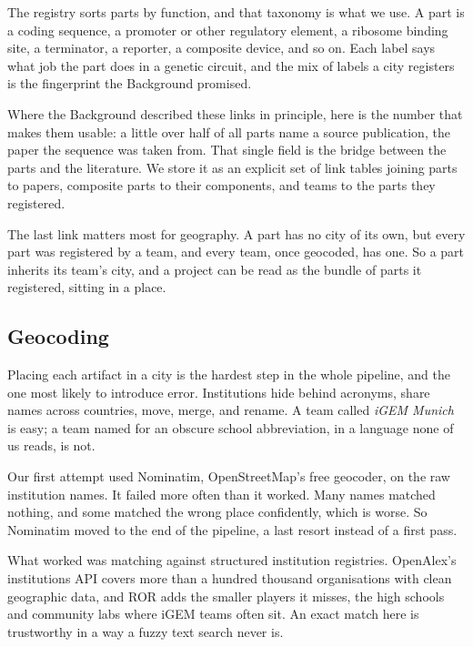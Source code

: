 \documentclass[12pt,a4paper]{article}
\begin{document}
	The registry sorts parts by function, and that taxonomy is what we use. A part is
	a coding sequence, a promoter or other regulatory element, a ribosome binding
	site, a terminator, a reporter, a composite device, and so on. Each label says
	what job the part does in a genetic circuit, and the mix of labels a city
	registers is the fingerprint the Background promised.
	
	Where the Background described these links in principle, here is the number that
	makes them usable: a little over half of all parts name a source publication, the
	paper the sequence was taken from. That single field is the bridge between the
	parts and the literature. We store it as an explicit set of link tables joining
	parts to papers, composite parts to their components, and teams to the parts they
	registered.
	
	The last link matters most for geography. A part has no city of its own, but every
	part was registered by a team, and every team, once geocoded, has one. So a part
	inherits its team's city, and a project can be read as the bundle of parts it
	registered, sitting in a place.
	
	\subsection{Geocoding}
	
	Placing each artifact in a city is the hardest step in the whole pipeline, and the
	one most likely to introduce error. Institutions hide behind acronyms, share names
	across countries, move, merge, and rename. A team called \textit{iGEM Munich} is
	easy; a team named for an obscure school abbreviation, in a language none of us
	reads, is not.
	
	Our first attempt used Nominatim, OpenStreetMap's free geocoder, on the raw
	institution names. It failed more often than it worked. Many names matched
	nothing, and some matched the wrong place confidently, which is worse. So
	Nominatim moved to the end of the pipeline, a last resort instead of a first pass.
	
	What worked was matching against structured institution registries. OpenAlex's
	institutions API covers more than a hundred thousand organisations with clean
	geographic data, and ROR adds the smaller players it misses, the high schools and
	community labs where iGEM teams often sit. An exact match here is trustworthy in a
	way a fuzzy text search never is.
	
\end{document}

